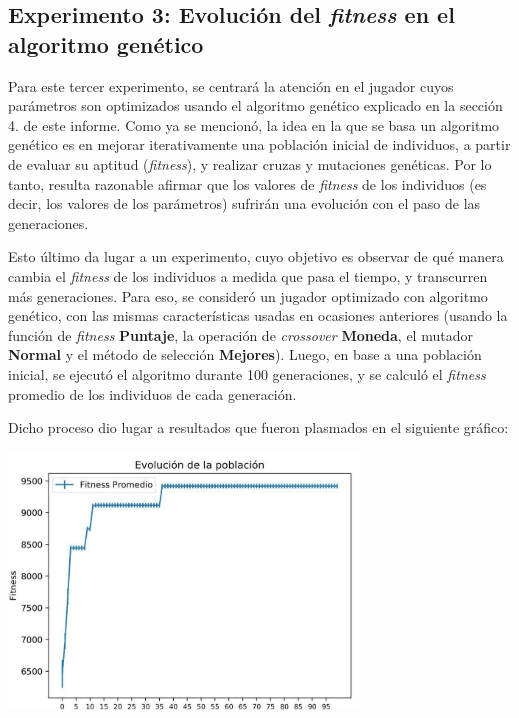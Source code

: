 \documentclass[12pt,a4paper]{article}
\begin{document}
    
    \subsection{Experimento 3: Evolución del \textit{fitness} en el algoritmo genético}
    
    Para este tercer experimento, se centrará la atención en el jugador cuyos parámetros son optimizados usando el algoritmo genético explicado en la sección 4. de este informe. Como ya se mencionó, la idea en la que se basa un algoritmo genético es en mejorar iterativamente una población inicial de individuos, a partir de evaluar su aptitud (\textit{fitness}), y realizar cruzas y mutaciones genéticas. Por lo tanto, resulta razonable afirmar que los valores de \textit{fitness} de los individuos (es decir, los valores de los parámetros) sufrirán una evolución con el paso de las generaciones.
    
    Esto último da lugar a un experimento, cuyo objetivo es observar de qué manera cambia el \textit{fitness} de los individuos a medida que pasa el tiempo, y transcurren más generaciones. Para eso, se consideró un jugador optimizado con algoritmo genético, con las mismas características usadas en ocasiones anteriores (usando la función de \textit{fitness} \textbf{Puntaje}, la operación de \textit{crossover} \textbf{Moneda}, el mutador \textbf{Normal} y el método de selección \textbf{Mejores}). Luego, en base a una población inicial, se ejecutó el algoritmo durante 100 generaciones, y se calculó el \textit{fitness} promedio de los individuos de cada generación.
    
    Dicho proceso dio lugar a resultados que fueron plasmados en el siguiente gráfico:
    
    \begin{center}
    \includegraphics[width=0.7\textwidth]{Evolucion_Genetico.jpg}
    \end{center}
    
\end{document}
